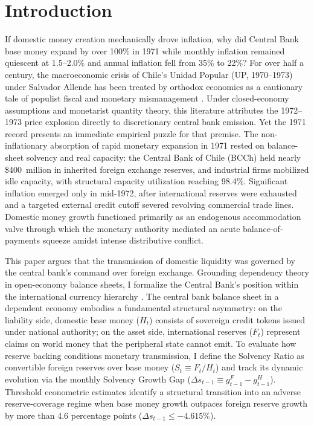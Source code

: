 \section{Introduction}
\label{sec:introduction}

If domestic money creation mechanically drove inflation, why did Central Bank base money expand by over 100\% in 1971 while monthly inflation remained quiescent at 1.5--2.0\% and annual inflation fell from 35\% to 22\%? For over half a century, the macroeconomic crisis of Chile's Unidad Popular (UP, 1970--1973) under Salvador Allende has been treated by orthodox economics as a cautionary tale of populist fiscal and monetary mismanagement \citep{LarrainMeller1991,Edwards2024}. Under closed-economy assumptions and monetarist quantity theory, this literature attributes the 1972--1973 price explosion directly to discretionary central bank emission. Yet the 1971 record presents an immediate empirical puzzle for that premise. The non-inflationary absorption of rapid monetary expansion in 1971 rested on balance-sheet solvency and real capacity: the Central Bank of Chile (BCCh) held nearly \$400~million in inherited foreign exchange reserves, and industrial firms mobilized idle capacity, with structural capacity utilization reaching 98.4\%. Significant inflation emerged only in mid-1972, after international reserves were exhausted and a targeted external credit cutoff severed revolving commercial trade lines. Domestic money growth functioned primarily as an endogenous accommodation valve through which the monetary authority mediated an acute balance-of-payments squeeze amidst intense distributive conflict.

This paper argues that the transmission of domestic liquidity was governed by the central bank's command over foreign exchange. Grounding dependency theory in open-economy balance sheets, I formalize the Central Bank's position within the international currency hierarchy \citep{Vasudevan2009,Basu2022}. The central bank balance sheet in a dependent economy embodies a fundamental structural asymmetry: on the liability side, domestic base money ($H_t$) consists of sovereign credit tokens issued under national authority; on the asset side, international reserves ($F_t$) represent claims on world money that the peripheral state cannot emit. To evaluate how reserve backing conditions monetary transmission, I define the Solvency Ratio as convertible foreign reserves over base money ($S_t \equiv F_t / H_t$) and track its dynamic evolution via the monthly Solvency Growth Gap ($\Delta s_{t-1} \equiv g^F_{t-1} - g^H_{t-1}$). Threshold econometric estimates identify a structural transition into an adverse reserve-coverage regime when base money growth outpaces foreign reserve growth by more than 4.6 percentage points ($\Delta s_{t-1} \le -4.615\%$).

